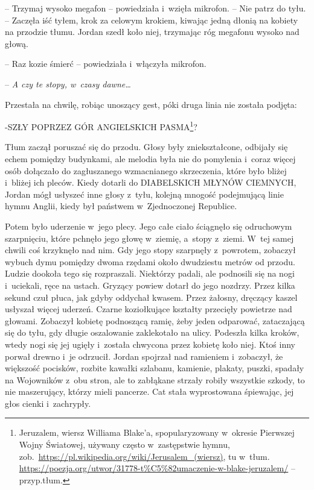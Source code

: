 \documentclass[oneside,polish,11pt,sfheadings]{mwbk}
\begin{document}
-- Trzymaj
wysoko megafon -- powiedziała i~wzięła mikrofon. -- Nie patrz do tyłu. -- Zaczęła iść tyłem, krok za celowym krokiem, kiwając jedną dłonią na
kobiety na przodzie tłumu. Jordan szedł koło niej, trzymając róg
megafonu wysoko nad głową.

-- Raz kozie śmierć -- powiedziała i~włączyła mikrofon.

-- \emph{A czy te stopy, w~czasy dawne\ldots}

Przestała na chwilę, robiąc unoszący gest, póki druga linia nie została
podjęta:

-SZŁY POPRZEZ GÓR ANGIELSKICH PASMA\footnote{Jeruzalem, wiersz
Williama Blake'a, spopularyzowany w~okresie Pierwszej Wojny Światowej,
używany często w~zastępstwie hymnu,
zob.~\url{https://pl.wikipedia.org/wiki/Jerusalem\_(wiersz)},
tu w~tłum.
\url{https://poezja.org/utwor/31778-t\%C5\%82umaczenie-w-blake-jeruzalem/} --
przyp.tłum.}?

Tłum zaczął poruszać się do przodu. Głosy były zniekształcone, odbijały
się echem pomiędzy budynkami, ale melodia była nie do pomylenia i~coraz
więcej osób dołączało do zagłuszanego wzmacnianego skrzeczenia, które
było bliżej i~bliżej ich pleców. Kiedy dotarli do DIABELSKICH MŁYNÓW
CIEMNYCH, Jordan mógł usłyszeć inne głosy z~tyłu, kolejną mnogość
podejmującą linie hymnu Anglii, kiedy był państwem w~Zjednoczonej
Republice.

Potem było uderzenie w~jego plecy. Jego całe ciało ściągnęło się
odruchowym szarpnięciu, które pchnęło jego głowę w~ziemię, a~stopy z~ziemi. W~tej samej chwili coś krzyknęło nad nim. Gdy jego stopy
szarpnęły z~powrotem, zobaczył wybuch dymu pomiędzy dwoma rzędami około
dwudziestu metrów od przodu. Ludzie dookoła tego się rozpraszali.
Niektórzy padali, ale podnosili się na nogi i~uciekali, ręce na ustach.
Gryzący powiew dotarł do jego nozdrzy. Przez kilka sekund czuł płuca,
jak gdyby oddychał kwasem. Przez żałosny, dręczący kaszel usłyszał
więcej uderzeń. Czarne koziołkujące kształty przecięły powietrze nad
głowami. Zobaczył kobietę podnoszącą ramię, żeby jeden odparować,
zataczającą się do tyłu, gdy długie oszalowanie zaklekotało na ulicy.
Podeszła kilka kroków, wtedy nogi się jej ugięły i~została chwycona
przez kobietę koło niej. Ktoś inny porwał drewno i~je odrzucił. Jordan
spojrzał nad ramieniem i~zobaczył, że większość pocisków, rozbite
kawałki szlabanu, kamienie, plakaty, puszki, spadały na Wojowników z~obu
stron, ale to zabłąkane strzały robiły wszystkie szkody, to nie
maszerujący, którzy mieli pancerze. Cat stała wyprostowana śpiewając,
jej głos cienki i~zachrypły.
\end{document}
